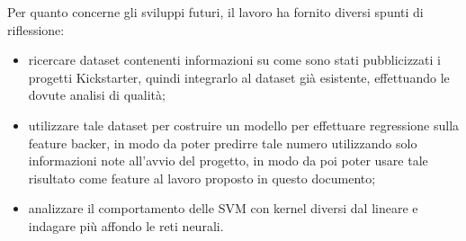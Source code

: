 Per quanto concerne gli sviluppi futuri, il lavoro ha fornito diversi spunti di riflessione:\begin{itemize}
	\item ricercare dataset contenenti informazioni su come sono stati pubblicizzati i progetti Kickstarter, quindi integrarlo al dataset già esistente, effettuando le dovute analisi di qualità;
	\item utilizzare tale dataset per costruire un modello per effettuare regressione sulla feature backer, in modo da poter predirre tale numero utilizzando solo informazioni note all'avvio del progetto, in modo da poi poter usare tale risultato come feature al lavoro proposto in questo documento;
	\item analizzare il comportamento delle SVM con kernel diversi dal lineare e indagare più affondo le reti neurali.
\end{itemize}